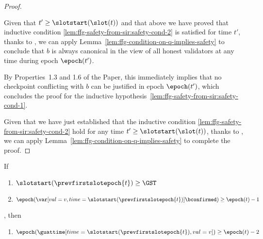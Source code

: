 \documentclass{article}
\begin{document}
\begin{proof}
\begin{description}
        Given that $t'\geq\slotstart(\slot(t))$ and that above we have proved that inductive condition \ref{lem:ffg-safety-from-sir:safety-cond-2} is satisfied for time $t'$, thanks to \sirone, we can apply Lemma~\ref{lem:ffg-condition-on-q-implies-safety} to conclude that $b$ is always canonical in the view of all honest validators at any time during epoch $\epoch(t')$.

        By Properties~1.3 and 1.6 of the Paper, this immediately implies that no checkpoint conflicting with $b$ can be justified in epoch $\epoch(t') $, which concludes the proof for the inductive hypothesis~\ref{lem:ffg-safety-from-sir:safety-cond-1}.
    \end{description}
    Given that we have just established that the inductive condition \ref{lem:ffg-safety-from-sir:safety-cond-2} hold for any time $t' \geq \slotstart(\slot(t))$, thanks to \sirone, we can apply Lemma~\ref{lem:ffg-condition-on-q-implies-safety} to complete the proof.
\end{proof}

\begin{lemma}\label{lem:epoch-gu-less-than-two-epoch-ago-start-epoch}
    If
    \begin{enumerate}
        \item $\slotstart(\prevfirstslotepoch{t})\geq \GST$
        \item $\epoch(\var[val=v,time=\slotstart(\prevfirstslotepoch{t})]{\bconfirmed}) \geq \epoch(t) - 1$
    \end{enumerate},
    then
    \begin{enumerate}
        \item $\epoch(\guattime[time=\slotstart(\prevfirstslotepoch{t}),val=v]) \geq \epoch(t)-2$
    \end{enumerate}
\end{lemma}
\end{document}
